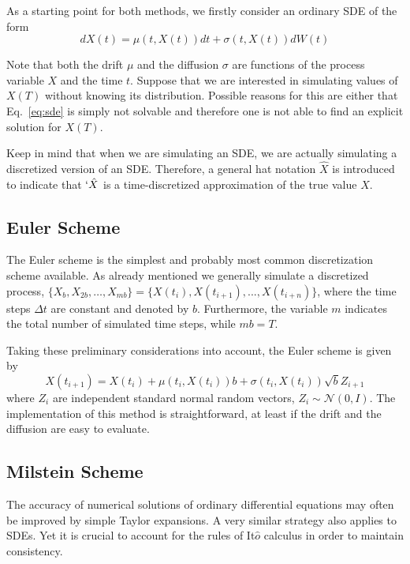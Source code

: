 As a starting point for both methods, we firstly consider an ordinary SDE of the form
\begin{equation}
dX(t) = \mu(t, X(t))dt + \sigma(t, X(t)) dW (t)
\label{eq:sde}
\end{equation}

Note that both the drift $\mu$ and the diffusion $\sigma$ are functions of the process 
variable $X$ and the time $t$. Suppose that we are interested in simulating values of 
$X(T)$ without knowing its distribution. Possible reasons for this are either 
that Eq.~\ref{eq:sde} is simply not solvable and therefore one is not able to find 
an explicit solution for $X(T)$.

Keep in mind that when we are simulating an SDE, we are actually simulating a 
discretized version of an SDE. Therefore, a general hat notation $\hat{X}$ 
is introduced to indicate that $`\hat{X}$ is a time-discretized approximation of the true value $X$.

\subsection{Euler Scheme}
The Euler scheme is the simplest and probably most common discretization scheme 
available. As already mentioned we generally simulate a discretized process, 
$\{X_b, X_{2b},\ldots, X_{mb}\} = \{X(t_i), X(t_{i+1}),...,X(t_{i+n})\}$, where 
the time steps $\Delta t$ are constant and denoted by $b$. Furthermore, the 
variable $m$ indicates the total number of simulated time steps, while $mb = T$.

Taking these preliminary considerations into account, the Euler scheme is given by
\begin{equation}
X(t_{i+1}) = X(t_i) + \mu(t_i , X(t_i))b + \sigma(t_i , X(t_i))\sqrt{b}Z_{i+1}
\label{eq:euler_scheme}
\end{equation}
where $Z_i$ are independent standard normal random vectors, $Z_i ∼ \mathcal{N}(0,I)$. 
The implementation of this method is straightforward, at least if the drift and the 
diffusion are easy to evaluate.

\subsection{Milstein Scheme}
The accuracy of numerical solutions of ordinary differential equations may 
often be improved by simple Taylor expansions. A very similar strategy also 
applies to SDEs. Yet it is crucial to account for the rules of It$\hat{o}$ calculus 
in order to maintain consistency.

